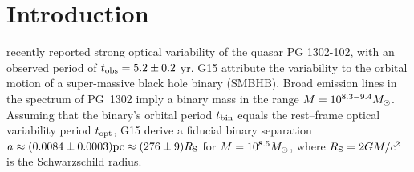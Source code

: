 


\section{Introduction}
\citet[][hereafter G15]{Graham:2015} recently reported strong optical
variability of the quasar PG 1302-102, with an observed period of
$t_{\rm{obs}} = 5.2 \pm 0.2$ yr. G15 attribute the variability to the
orbital motion of a super-massive black hole binary (SMBHB). Broad
emission lines in the spectrum of PG~1302 imply a binary mass in the
range $M = 10^{8.3-9.4} {M_{\odot}}$. Assuming that the binary's orbital
period $t_{\rm bin}$ equals the rest--frame optical variability period
$t_{\rm opt}$, G15 derive a fiducial binary separation $a\approx
(0.0084 \pm 0.0003)\mbox{pc} \approx (276 \pm 9) R_{\rm{S}}$ for $M=10^{8.5}
{M_{\odot}}$, where $R_{\rm{S}} = 2GM/c^2$ is the Schwarzschild radius.

